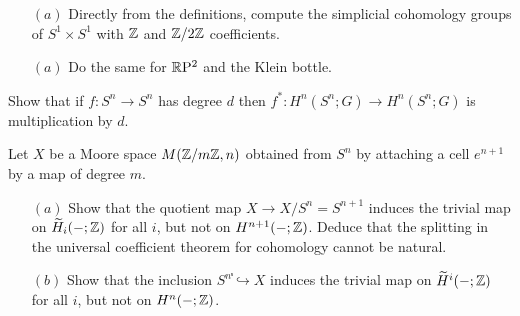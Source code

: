 \begin{exercise}
\mbox{}
\begin{itemize}
\item[$(a)$]Directly from the definitions, compute the simplicial cohomology groups of $S^1\times S^1$ with $\mathbb{Z}$ and $\mathbb{Z}/2\mathbb{Z}$ coefficients.
\item[$(a)$]Do the same for $\mathbb{R}\mathrm{P}^2$ and the Klein bottle.
\end{itemize}
\end{exercise}
\begin{exercise}
Show that if $f:S^n\to S^n$ has degree $d$ then $f^*:H^n(S^n;G)\to H^n(S^n;G)$ is multiplication by $d$.
\end{exercise}
\begin{exercise}
Let $X$ be a Moore space $M(\mathbb{Z}/m\mathbb{Z},n)$ obtained from $S^n$ by attaching a cell $e^{n+1}$ by a map of degree $m$.
\begin{itemize}
\item[$(a)$]Show that the quotient map $X\to X/S^n=S^{n+1}$ induces the trivial map on $\widetilde{H}_i(-;\mathbb{Z})$ for all $i$, but not on $H^{n+1}(-;\mathbb{Z})$. Deduce that the splitting in the universal coefficient
theorem for cohomology cannot be natural.
\item[$(b)$]Show that the inclusion $S^n֓\hookrightarrow X$ induces the trivial map on $\widetilde{H}^i(-;\mathbb{Z})$ for all $i$, but not on $H^n(-;\mathbb{Z})$.
\end{itemize}
\end{exercise}
